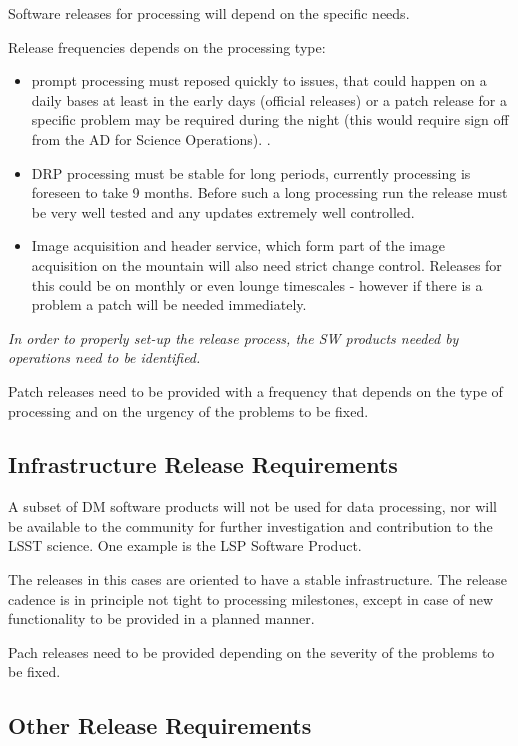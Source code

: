 Software  releases for processing  will depend on the specific needs.

Release frequencies depends on the processing type:

\begin{itemize}
\item prompt processing must reposed quickly to issues, that could happen on a daily bases at least in the early days (official releases)
 or a  patch release  for a specific problem may be required during the night (this would require sign off from the AD for Science Operations).  .
\item DRP processing  must be stable for long periods, currently processing is foreseen to take 9 months.  Before such a long processing run the release must be very well tested and any updates extremely well controlled.
\item Image acquisition and header service, which form part of the image acquisition on the mountain will also need strict change control. Releases for this could be on monthly or even lounge timescales - however if there is a problem a patch will be needed immediately.
\end{itemize}

\textit{In order to properly set-up the release process, the SW products needed by operations need to be identified.}

Patch releases need to be provided with a frequency that depends on the type of processing
and on the urgency of the problems to be fixed.


\subsection{Infrastructure Release Requirements} \label{sec:infreqs}

A subset of DM software products will not be used for data processing,
nor will be available to the community for further investigation and contribution to the LSST science.
One example is the LSP Software Product.

The releases in this cases are oriented to have a stable infrastructure.
The release cadence is in principle not tight to processing milestones,
except in case of new functionality to be provided in a planned manner.

Pach releases need to be provided depending on the severity of the problems to be fixed.


\subsection{Other Release Requirements} \label{other:reqs}

